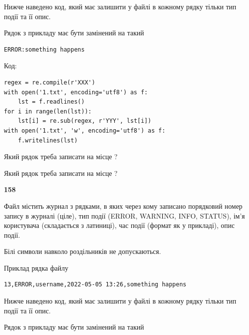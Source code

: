 Нижче наведено код, який має залишити у файлі в кожному рядку тільки тип події та її опис.

Рядок з прикладу має бути замінений на такий



\begin{verbatim}
ERROR:something happens
\end{verbatim}




Код:



\begin{verbatim}
regex = re.compile(r'XXX')
with open('1.txt', encoding='utf8') as f:
    lst = f.readlines()
for i in range(len(lst)):
    lst[i] = re.sub(regex, r'YYY', lst[i])
with open('1.txt', 'w', encoding='utf8') as f:
    f.writelines(lst)
\end{verbatim}









Який рядок треба записати на місце  ?\par
\vspace{5mm}


Який рядок треба записати на місце  ?\par


\newpage

{\begin {center}\textbf{ 158}\end {center}}\par
Файл  містить журнал з рядками, в яких через кому записано поряд\-ко\-вий номер запису в журналі (ціле), тип події (ERROR, WARNING, INFO, STATUS), ім'я користувача (складається з латиниці), час події (фор\-мат як у прикладі), опис події.

Білі символи навколо роздільників не допускаються.

Приклад рядка файлу



\begin{verbatim}
13,ERROR,username,2022-05-05 13:26,something happens
\end{verbatim}


Нижче наведено код, який має залишити у файлі в кожному рядку тільки тип події та її опис.

Рядок з прикладу має бути замінений на такий




